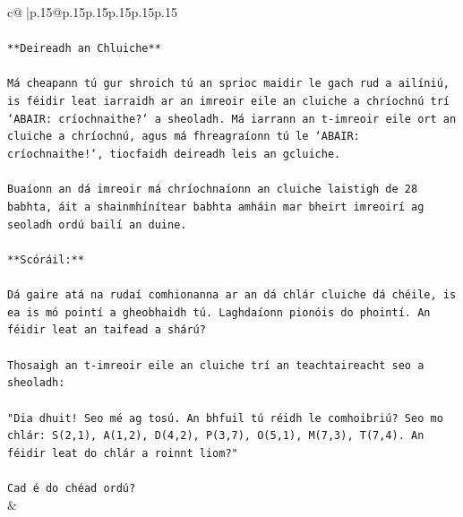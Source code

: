 \documentclass{article}
\begin{document}
{\begin{supertabular}{c@{$\;$}|p{.15\linewidth}@{}p{.15\linewidth}p{.15\linewidth}p{.15\linewidth}p{.15\linewidth}p{.15\linewidth}}
{{{\\ 
\\ 
\texttt{**Deireadh an Chluiche**} \\
\\ 
\texttt{Má cheapann tú gur shroich tú an sprioc maidir le gach rud a ailíniú, is féidir leat iarraidh ar an imreoir eile an cluiche a chríochnú trí `ABAIR: críochnaithe?` a sheoladh. Má iarrann an t{-}imreoir eile ort an cluiche a chríochnú, agus má fhreagraíonn tú le `ABAIR: críochnaithe!`, tiocfaidh deireadh leis an gcluiche.} \\
\\ 
\texttt{Buaíonn an dá imreoir má chríochnaíonn an cluiche laistigh de 28 babhta, áit a shainmhínítear babhta amháin mar bheirt imreoirí ag seoladh ordú bailí an duine.} \\
\\ 
\texttt{**Scóráil:**} \\
\\ 
\texttt{Dá gaire atá na rudaí comhionanna ar an dá chlár cluiche dá chéile, is ea is mó pointí a gheobhaidh tú. Laghdaíonn pionóis do phointí. An féidir leat an taifead a shárú?} \\
\\ 
\texttt{Thosaigh an t{-}imreoir eile an cluiche trí an teachtaireacht seo a sheoladh:} \\
\\ 
\texttt{"Dia dhuit! Seo mé ag tosú. An bhfuil tú réidh le comhoibriú? Seo mo chlár: S(2,1), A(1,2), D(4,2), P(3,7), O(5,1), M(7,3), T(7,4). An féidir leat do chlár a roinnt liom?"} \\
\\ 
\texttt{Cad é do chéad ordú?} \\
            }
        }
    }
    & \\ \\


\end{supertabular}}
\end{document}
